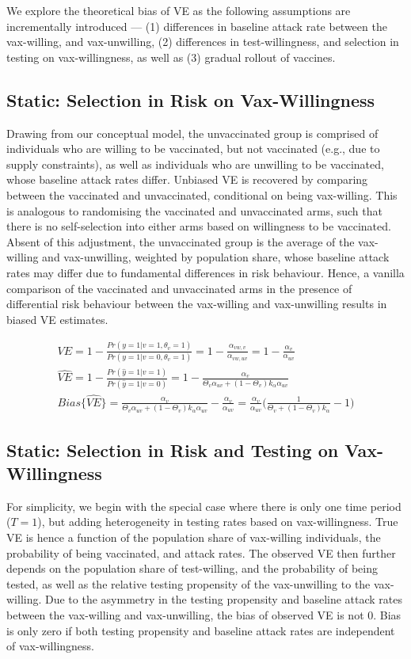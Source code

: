 \documentclass[12pt]{article}
\begin{document}
We explore the theoretical bias of VE as the following assumptions are incrementally introduced --- (1) differences in baseline attack rate between the vax-willing, and vax-unwilling, (2) differences in test-willingness, and selection in testing on vax-willingness, as well as (3) gradual rollout of vaccines.

\subsection{Static: Selection in Risk on Vax-Willingness}
Drawing from our conceptual model, the unvaccinated group is comprised of individuals who are willing to be vaccinated, but not vaccinated (e.g., due to supply constraints), as well as individuals who are unwilling to be vaccinated, whose baseline attack rates differ. Unbiased VE is recovered by comparing between the vaccinated and unvaccinated, conditional on being vax-willing. This is analogous to randomising the vaccinated and unvaccinated arms, such that there is no self-selection into either arms based on willingness to be vaccinated. Absent of this adjustment, the unvaccinated group is the average of the vax-willing and vax-unwilling, weighted by population share, whose baseline attack rates may differ due to fundamental differences in risk behaviour. Hence, a vanilla comparison of the vaccinated and unvaccinated arms in the presence of differential risk behaviour between the vax-willing and vax-unwilling results in biased VE estimates.

\begin{eqnarray}
	VE = 1 - \frac{Pr(y=1 | v=1, \theta_{v} = 1)}{Pr(y=1 | v=0, \theta_{v} = 1)} = 1 - \frac{\alpha_{vw, v}}{\alpha_{vw, uv}} = 1 - \frac{\alpha_{v}}{\alpha_{uv}} \\ 
	\widehat{VE} = 1 - \frac{Pr(\hat{y}=1 | v=1)}{Pr(\hat{y}=1 | v=0)} = 1 - \frac{\alpha_{v}}{\Theta_{v}\alpha_{uv} + (1 - \Theta_{v}) k_{\alpha} \alpha_{uv}} \\
	{Bias}\{\widehat{VE}\} = \frac{\alpha_{v}}{\Theta_{v} \alpha_{uv} + (1 - \Theta_{v}) k_{\alpha} \alpha_{uv}} - \frac{\alpha_{v}}{\alpha_{uv}} = \frac{\alpha_{v}}{\alpha_{uv}} \Big(\frac{1}{\Theta_{v} + (1 - \Theta_{v}) k_{\alpha}} - 1\Big) 
\end{eqnarray}

\subsection{Static: Selection in Risk and Testing on Vax-Willingness}
For simplicity, we begin with the special case where there is only one time period ($T=1$), but adding heterogeneity in testing rates based on vax-willingness. True VE is hence a function of the population share of vax-willing individuals, the probability of being vaccinated, and attack rates. The observed VE then further depends on the population share of test-willing, and the probability of being tested, as well as the relative testing propensity of the vax-unwilling to the vax-willing. Due to the asymmetry in the testing propensity and baseline attack rates between the vax-willing and vax-unwilling, the bias of observed VE is not $0$. Bias is only zero if both testing propensity and baseline attack rates are independent of vax-willingness.
\end{document}
